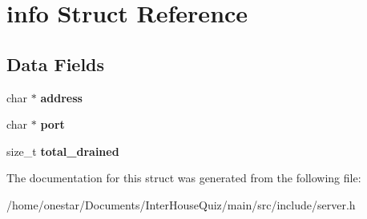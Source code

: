 \hypertarget{structinfo}{\section{info Struct Reference}
\label{structinfo}
}
\subsection*{Data Fields}
\begin{DoxyCompactItemize}
\item 
\hypertarget{structinfo_a879a8cdf605d02f8af8b2e216b8764f2}{char $\ast$ {\bfseries address}}\label{structinfo_a879a8cdf605d02f8af8b2e216b8764f2}

\item 
\hypertarget{structinfo_add99ba4ea70b8f66170823cad9a55fa4}{char $\ast$ {\bfseries port}}\label{structinfo_add99ba4ea70b8f66170823cad9a55fa4}

\item 
\hypertarget{structinfo_a67ddb9440cf0829040c8d98e2089a7f2}{size\+\_\+t {\bfseries total\+\_\+drained}}\label{structinfo_a67ddb9440cf0829040c8d98e2089a7f2}

\end{DoxyCompactItemize}


The documentation for this struct was generated from the following file\+:\begin{DoxyCompactItemize}
\item 
/home/onestar/\+Documents/\+Inter\+House\+Quiz/main/src/include/server.\+h\end{DoxyCompactItemize}
